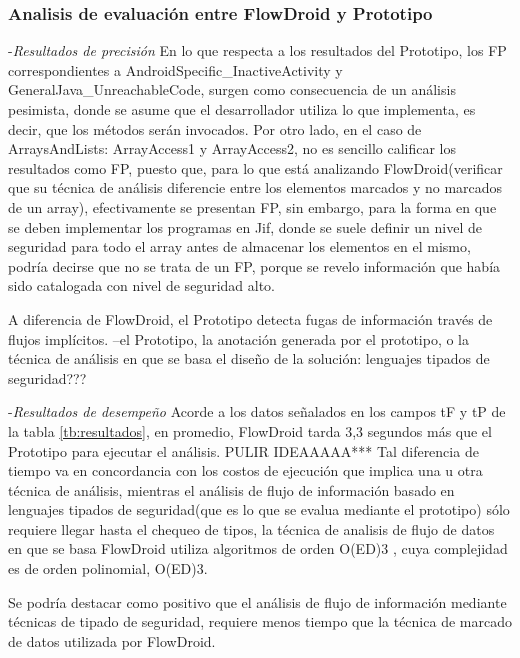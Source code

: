 \subsubsection{Analisis de evaluación entre FlowDroid y Prototipo}
-\textit{Resultados de precisión}\newline
En lo que respecta a los resultados del Prototipo, los FP correspondientes a
AndroidSpecific\_InactiveActivity y GeneralJava\_UnreachableCode, surgen como
consecuencia de un análisis pesimista, donde se asume que el desarrollador
utiliza lo que implementa, es decir, que los métodos serán invocados.\newline 
Por otro lado, en el caso de ArraysAndLists: ArrayAccess1 y ArrayAccess2, no es
sencillo calificar los resultados como FP, puesto que, para lo que está
analizando FlowDroid(verificar que su técnica de análisis diferencie entre los
elementos marcados y no marcados de un array), efectivamente se presentan FP,
sin embargo, para la forma en que se deben implementar los programas en Jif,
donde se suele definir un nivel de seguridad para todo el array antes de
almacenar los elementos en el mismo, podría decirse que no se trata de un FP,
porque se revelo información que había sido catalogada con nivel de seguridad alto.

A diferencia de FlowDroid, el Prototipo detecta fugas de
información través de flujos implícitos.\newline
--el Prototipo, la anotación generada por el prototipo, o la técnica de análisis
en que se basa el diseño de la solución: lenguajes tipados de seguridad???

-\textit{Resultados de desempeño}\newline
Acorde a los datos señalados en los campos tF y tP de la tabla
\ref{tb:resultados}, en promedio, FlowDroid tarda 3,3 segundos más que el
Prototipo para ejecutar el análisis.\newline
PULIR IDEAAAAA***\newline
Tal diferencia de tiempo va en concordancia con los costos de ejecución que
implica una u otra técnica de análisis, mientras el análisis de flujo de
información basado en lenguajes tipados de seguridad(que es lo que se evalua
mediante el prototipo) sólo requiere llegar hasta el chequeo de tipos, la
técnica de analisis de flujo de datos en que se basa FlowDroid utiliza
algoritmos de orden O(ED)3 , cuya complejidad es de orden polinomial,
O(ED)3\cite[page 3]{FCO-PDG}.\newline

Se podría destacar como positivo que el análisis de flujo de información
mediante técnicas de tipado de seguridad, requiere menos tiempo que la técnica
de marcado de datos utilizada por FlowDroid.

